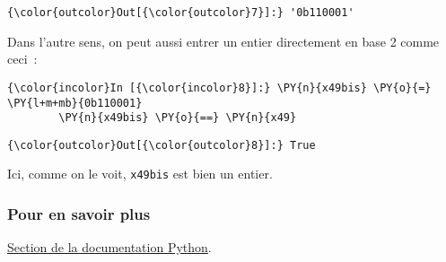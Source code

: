 \begin{Verbatim}[commandchars=\\\{\}]
{\color{outcolor}Out[{\color{outcolor}7}]:} '0b110001'
\end{Verbatim}
            
    Dans l'autre sens, on peut aussi entrer un entier directement en base 2
comme ceci~:

    \begin{Verbatim}[commandchars=\\\{\}]
{\color{incolor}In [{\color{incolor}8}]:} \PY{n}{x49bis} \PY{o}{=} \PY{l+m+mb}{0b110001}
        \PY{n}{x49bis} \PY{o}{==} \PY{n}{x49}
\end{Verbatim}


\begin{Verbatim}[commandchars=\\\{\}]
{\color{outcolor}Out[{\color{outcolor}8}]:} True
\end{Verbatim}
            
    Ici, comme on le voit, \texttt{x49bis} est bien un entier.

    \hypertarget{pour-en-savoir-plus}{%
\subsubsection{Pour en savoir plus}\label{pour-en-savoir-plus}}

    \href{https://docs.python.org/3/library/stdtypes.html\#bitwise-operations-on-integer-types}{Section
de la documentation Python}.